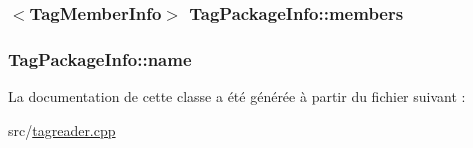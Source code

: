 \subsubsection[{members}]{$<${\bf Tag\+Member\+Info}$>$ Tag\+Package\+Info\+::members}\label{class_tag_package_info_addf2e409596c0cf34c5740242977677c}
\hypertarget{class_tag_package_info_a6421c38b37145e1f056b28858a03ed7b}{}
\subsubsection[{name}]{ Tag\+Package\+Info\+::name}\label{class_tag_package_info_a6421c38b37145e1f056b28858a03ed7b}


La documentation de cette classe a été générée à partir du fichier suivant \+:\begin{DoxyCompactItemize}
\item 
src/\hyperlink{tagreader_8cpp}{tagreader.\+cpp}\end{DoxyCompactItemize}
